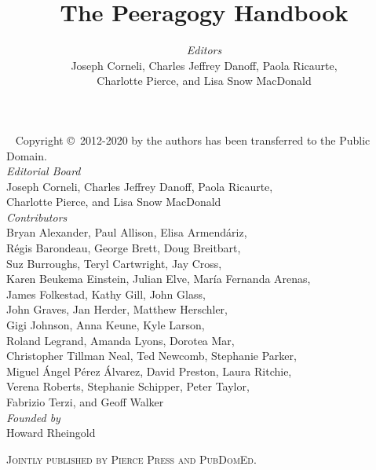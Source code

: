 \documentclass[nols,nobib]{tufte-book}
\title{The Peeragogy Handbook}
\author[The Tufte-LaTeX Developers]{\emph{Editors}\\
{\small Joseph Corneli, Charles Jeffrey Danoff, Paola Ricaurte,}\\
{\small Charlotte Pierce, and Lisa Snow MacDonald} \\[.25in]}
\let\sc\scshape
\renewcommand\smallcaps[1]{{\sc #1}}
\begin{document}
\frontmatter

\maketitle

\newpage
\begin{fullwidth}
~\vfill
\thispagestyle{empty}
\setlength{\parindent}{0pt}
\setlength{\parskip}{\baselineskip}
Copyright \copyright\ {2012-2020} by the authors has been transferred to the Public Domain.\\[.25in]

\emph{Editorial Board}\\
{\small Joseph Corneli, Charles Jeffrey Danoff, Paola Ricaurte,}\\
{\small Charlotte Pierce, and Lisa Snow MacDonald} \\[.25in]

\emph{Contributors} \\
{\small Bryan Alexander, Paul Allison, Elisa Armend\'ariz,} \\
{\small R\'egis Barondeau, George Brett, Doug Breitbart,}\\ 
{\small Suz Burroughs, Teryl Cartwright, Jay Cross,}\\
{\small Karen Beukema Einstein, Julian Elve, Mar\'ia Fernanda Arenas,}\\
{\small James Folkestad, Kathy Gill, John Glass,} \\
{\small John Graves, Jan Herder, Matthew Herschler,} \\
{\small Gigi Johnson, Anna Keune, Kyle Larson,} \\
{\small Roland Legrand, Amanda Lyons, Dorotea Mar,} \\
{\small Christopher Tillman Neal, Ted Newcomb, Stephanie Parker,} \\
{\small Miguel \'Angel P\'erez \'Alvarez, David Preston, Laura Ritchie,} \\
{\small Verena Roberts, Stephanie Schipper, Peter Taylor,}\\
{\small Fabrizio Terzi, and Geoff Walker}\\[.25in]

\emph{Founded by}\\
{\small Howard Rheingold}\\[.25in]

\par\smallcaps{Jointly published by Pierce Press and PubDomEd.}


\end{fullwidth}
\end{document}
